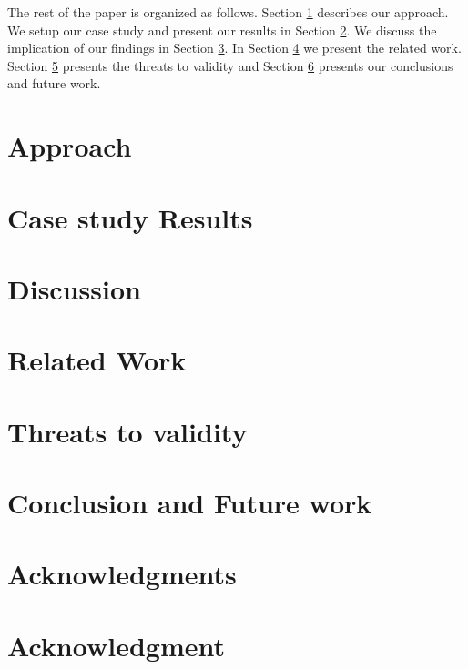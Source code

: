 \documentclass[10pt,journal,compsoc]{IEEEtran}
\begin{document}
The rest of the paper is organized as follows. Section \ref{sec:approach} describes our approach. We setup our case study and present our
results in Section \ref{sec:case_study_results}. We discuss the implication of our findings in Section \ref{sec:discussion}. In Section \ref{sec:related_work} we present the related work. Section \ref{sec:threats_to_validity} presents the threats to validity and Section \ref{sec:conclusion} presents our conclusions and future work.  

\section{Approach}
\label{sec:approach}


\section{Case study Results}
\label{sec:case_study_results}


\section{Discussion}
\label{sec:discussion}


\section{Related Work}
\label{sec:related_work}


\section{Threats to validity}
\label{sec:threats_to_validity}


\section{Conclusion and Future work}
\label{sec:conclusion}





\ifCLASSOPTIONcompsoc
  \section*{Acknowledgments}
\else
  \section*{Acknowledgment}
\fi
\end{document}
